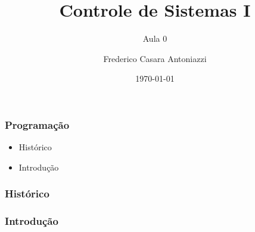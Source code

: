 \documentclass[12pt]{beamer}
\begin{document}
	\author{Frederico Casara Antoniazzi}
	\title{Controle de Sistemas I}
	\subtitle{Aula 0}
	\date{\today}
	
	\begin{frame}[plain]
		\maketitle
	\end{frame}
	
	\begin{frame}
		\frametitle{Programação}
		
		\begin{itemize}
			\item Histórico
			\item Introdução
		\end{itemize}
		
	\end{frame}
	
	\begin{frame}
		\frametitle{Histórico}
	\end{frame}
	
	\begin{frame}
		\frametitle{Introdução}
	\end{frame}
	
	\begin{frame}
		\frametitle{}
	\end{frame}
	
	\begin{frame}
		\frametitle{}
	\end{frame}
	
\end{document}
